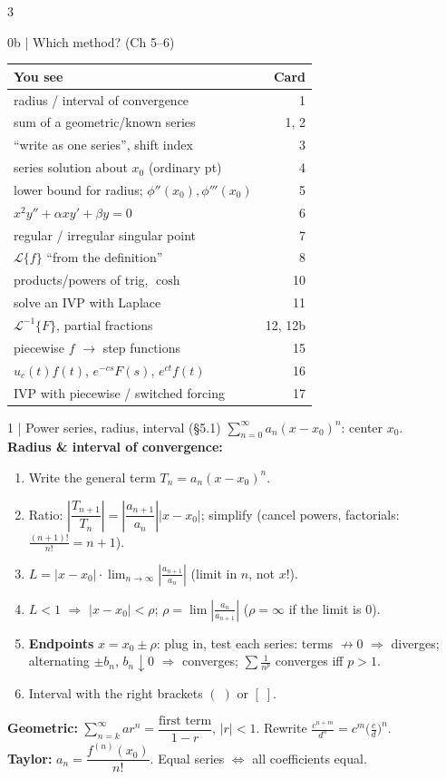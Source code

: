 \documentclass[8pt]{extarticle}
\newcommand{\key}[1]{\textcolor{grn}{\textbf{#1}}}
\newcommand{\Lap}{\mathcal{L}}
\newcommand{\Li}{\mathcal{L}^{-1}}
\begin{document}
\begin{multicols*}{3}
\raggedcolumns
\begin{card}{0b \;|\; Which method? (Ch 5--6)}
\renewcommand{\arraystretch}{1.05}
\begin{tabular}{@{}>{\raggedright\arraybackslash}p{\dimexpr\linewidth-0.42in}@{\;}r@{}}
\textbf{You see} & \textbf{Card}\\\hline
radius / interval of convergence & 1\\
sum of a geometric/known series & 1, 2\\
``write as one series'', shift index & 3\\
series solution about $x_0$ (ordinary pt) & 4\\
lower bound for radius; $\phi''(x_0),\phi'''(x_0)$ & 5\\
$x^2y''+\alpha xy'+\beta y=0$ & 6\\
regular / irregular singular point & 7\\
$\Lap\{f\}$ ``from the definition'' & 8\\
products/powers of trig, $\cosh$ & 10\\
solve an IVP with Laplace & 11\\
$\Li\{F\}$, partial fractions & 12, 12b\\
piecewise $f$ $\to$ step functions & 15\\
$u_c(t)f(t)$, $e^{-cs}F(s)$, $e^{ct}f(t)$ & 16\\
IVP with piecewise / switched forcing & 17
\end{tabular}
\end{card}

\begin{card}{1 \;|\; Power series, radius, interval (\S5.1)}
$\sum_{n=0}^\infty a_n(x-x_0)^n$: center $x_0$.\\
\key{Radius \& interval of convergence:}
\begin{enumerate}
\item Write the general term $T_n=a_n(x-x_0)^n$.
\item Ratio: $\left|\dfrac{T_{n+1}}{T_n}\right|=\left|\dfrac{a_{n+1}}{a_n}\right||x-x_0|$; simplify (cancel powers, factorials: $\frac{(n+1)!}{n!}=n+1$).
\item $L=|x-x_0|\cdot\lim_{n\to\infty}\left|\frac{a_{n+1}}{a_n}\right|$ (limit in $n$, not $x$!).
\item $L<1$ $\Rightarrow$ $|x-x_0|<\rho$; \;$\rho=\lim\left|\frac{a_n}{a_{n+1}}\right|$ ($\rho=\infty$ if the limit is $0$).
\item \key{Endpoints} $x=x_0\pm\rho$: plug in, test each series: terms $\not\to0$ $\Rightarrow$ diverges; alternating $\pm b_n$, $b_n\downarrow0$ $\Rightarrow$ converges; $\sum\frac1{n^p}$ converges iff $p>1$.
\item Interval with the right brackets $(\;)$ or $[\;]$.
\end{enumerate}
\key{Geometric:} $\sum_{n=k}^\infty ar^n=\dfrac{\text{first term}}{1-r}$, $|r|<1$. Rewrite $\frac{c^{n+m}}{d^n}=c^m\big(\frac cd\big)^n$.\\
\key{Taylor:} $a_n=\dfrac{f^{(n)}(x_0)}{n!}$. Equal series $\iff$ all coefficients equal.
\end{card}


\end{multicols*}
\end{document}
